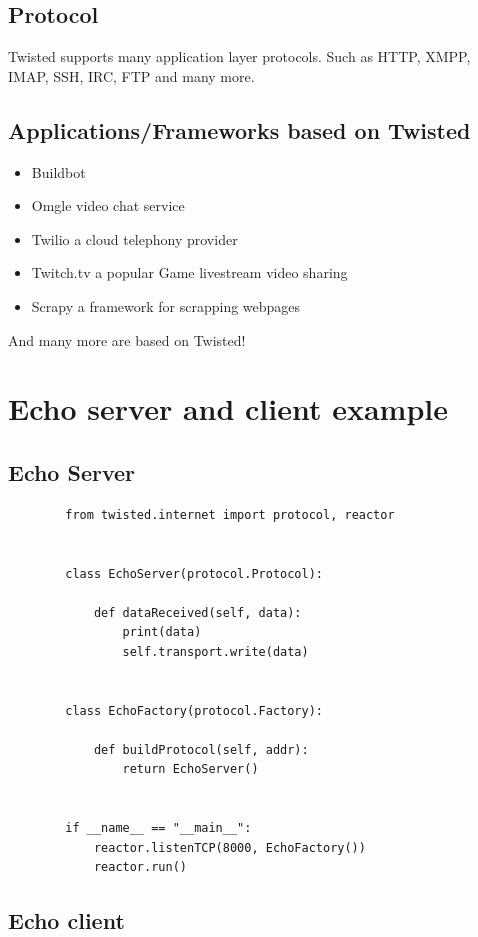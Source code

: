 \documentclass{article}
\begin{document}
    \subsection{Protocol}
      Twisted supports many application layer protocols. Such as HTTP, XMPP,
      IMAP, SSH, IRC, FTP and many more.

    \subsection{Applications/Frameworks based on Twisted}

    \begin{itemize}
      \item Buildbot \cite{buildbot}
      \item Omgle video chat service \cite{omegle}
      \item Twilio a cloud telephony provider \cite{twilio}
      \item Twitch.tv a popular Game livestream video sharing \cite{twitch}
      \item Scrapy a framework for scrapping webpages \cite{SCrapy}
    \end{itemize}

    And many more are based on Twisted!

  \section{Echo server and client example}

    \subsection{Echo Server}
      \begin{verbatim}
        from twisted.internet import protocol, reactor


        class EchoServer(protocol.Protocol):

            def dataReceived(self, data):
                print(data)
                self.transport.write(data)


        class EchoFactory(protocol.Factory):

            def buildProtocol(self, addr):
                return EchoServer()


        if __name__ == "__main__":
            reactor.listenTCP(8000, EchoFactory())
            reactor.run()
      \end{verbatim}

      \subsection{Echo client}
\end{document}
